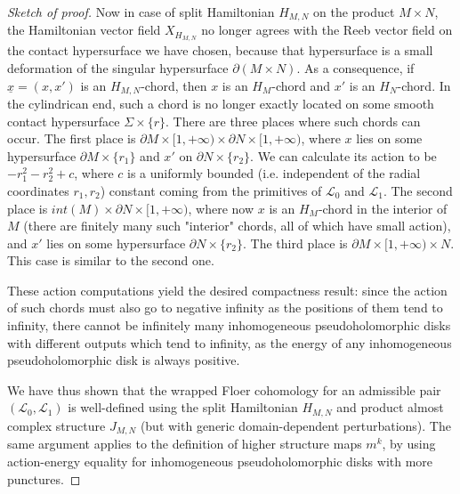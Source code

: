 \documentclass{amsart}
\numberwithin{equation}{section}
\numberwithin{figure}{section}
\begin{document}
\begin{proof}[Sketch of proof]
	Now in case of split Hamiltonian $H_{M, N}$ on the product $M \times N$, the Hamiltonian vector field $X_{H_{M, N}}$ no longer agrees with the Reeb vector field on the contact hypersurface we have chosen, because that hypersurface is a small deformation of the singular hypersurface $\partial (M \times N)$. As a consequence, if $\underline{x}=(x, x')$ is an $H_{M, N}$-chord, then $x$ is an $H_{M}$-chord and $x'$ is an $H_{N}$-chord. In the cylindrican end, such a chord is no longer exactly located on some smooth contact hypersurface $\Sigma \times \{r\}$. There are three places where such chords can occur. The first place is $\partial M \times [1, +\infty) \times \partial N \times [1, +\infty)$, where $x$ lies on some hypersurface $\partial M \times \{r_{1}\}$ and $x'$ on $\partial N \times \{r_{2}\}$. We can calculate its action to be $-r_{1}^{2} - r_{2}^{2} + c$, where $c$ is a uniformly bounded (i.e. independent of the radial coordinates $r_{1}, r_{2}$) constant coming from the primitives of $\mathcal{L}_{0}$ and $\mathcal{L}_{1}$. The second place is $int(M) \times \partial N \times [1, +\infty)$, where now $x$ is an $H_{M}$-chord in the interior of $M$ (there are finitely many such "interior" chords, all of which have small action), and $x'$ lies on some hypersurface $\partial N \times \{r_{2}\}$. The third place is $\partial M \times [1, +\infty) \times N$. This case is similar to the second one. \par
	 These action computations yield the desired compactness result: since the action of such chords must also go to negative infinity as the positions of them tend to infinity, there cannot be infinitely many inhomogeneous pseudoholomorphic disks with different outputs which tend to infinity, as the energy of any inhomogeneous pseudoholomorphic disk is always positive. \par
	 We have thus shown that the wrapped Floer cohomology for an admissible pair $(\mathcal{L}_{0}, \mathcal{L}_{1})$ is well-defined using the split Hamiltonian $H_{M, N}$ and product almost complex structure $J_{M, N}$ (but with generic domain-dependent perturbations). The same argument applies to the definition of higher structure maps $m^{k}$, by using action-energy equality for inhomogeneous pseudoholomorphic disks with more punctures. \par
\end{proof}

\end{document}

